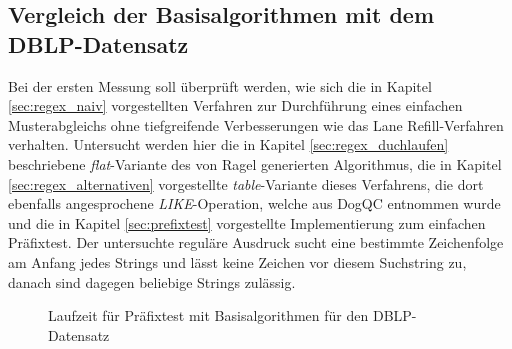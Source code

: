 \subsection{Vergleich der Basisalgorithmen mit dem DBLP-Datensatz}
\label{sec:regex_evaluation_beobachtung_1}

Bei der ersten Messung soll überprüft werden, wie sich die in Kapitel \ref{sec:regex_naiv} vorgestellten Verfahren zur Durchführung eines einfachen Musterabgleichs ohne tiefgreifende Verbesserungen wie das Lane Refill-Verfahren verhalten.
Untersucht werden hier die in Kapitel \ref{sec:regex_duchlaufen} beschriebene \emph{flat}-Variante des von Ragel generierten Algorithmus, die in Kapitel \ref{sec:regex_alternativen} vorgestellte \emph{table}-Variante dieses Verfahrens, die dort ebenfalls angesprochene \emph{LIKE}-Operation, welche aus DogQC entnommen wurde und die in Kapitel \ref{sec:prefixtest} vorgestellte Implementierung zum einfachen Präfixtest.
Der untersuchte reguläre Ausdruck sucht eine bestimmte Zeichenfolge am Anfang jedes Strings und lässt keine Zeichen vor diesem Suchstring zu, danach sind dagegen beliebige Strings zulässig. 

\begin{figure}[ht]
	\centering
	\caption{Laufzeit für Präfixtest mit Basisalgorithmen für den DBLP-Datensatz}
	\label{fig:regex_dblpANY_no_buffer}
\end{figure}

